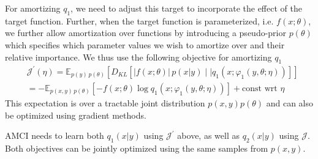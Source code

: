 \documentclass[12pt]{article}
\begin{document}

For amortizing $q_1$, we need to adjust this target to incorporate the effect of the
target function.  Further, when the target function is parameterized, i.e. $f(x;\theta)$,
we further allow amortization over functions by introducing a pseudo-prior $p(\theta)$ which
specifies which parameter values we wish to amortize over and their relative importance.
	We thus use the following objective for amortizing $q_1$
\begin{align}
&\mathcal{J}^{'}(\eta)
=
\mathbb{E}_{p(y)\,p(\theta)}\left[D_{KL} \left[ |f(x;\theta)| \, p(x|y) \mid\mid q_1(x;\varphi_1(y, \theta; \eta)) \right]\right] 
\nonumber \\
&=
-\mathbb{E}_{p(x,y)\,p(\theta)}\left[-f(x; \theta) \log q_1(x ;\varphi_1(y, \theta; \eta))\right] + \text{const wrt }\eta
\nonumber
\end{align}
This expectation is over a tractable joint distribution $p(x,y)p(\theta)$ 
and can also be optimized using gradient methods.

AMCI needs to learn both $q_1(x|y)$ using $\mathcal{J}^{'}$ above, 
as well as $q_2(x|y)$ using $\mathcal{J}$.
Both objectives can be jointly optimized using the same samples from $p(x,y)$.
\end{document}
